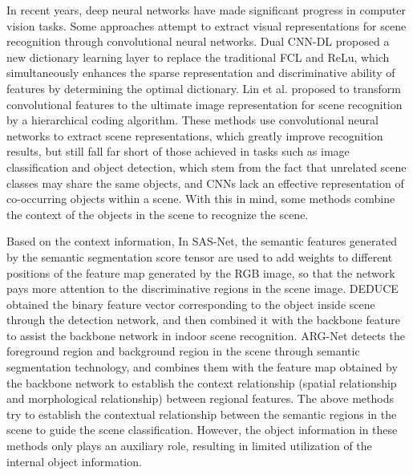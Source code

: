 \documentclass[conference]{IEEEtran}
\begin{document}
In recent years, deep neural networks have made significant progress in computer vision tasks\cite{ref9,ref10,ref11}. Some approaches\cite{ref5,ref12,ref13,ref14} attempt to extract visual representations for scene recognition through convolutional neural networks. Dual CNN-DL\cite{ref13} proposed a new dictionary learning layer to replace the traditional FCL and ReLu, which simultaneously enhances the sparse representation and discriminative ability of features by determining the optimal dictionary. Lin et al.\cite{ref15} proposed to transform convolutional features to the ultimate image representation for scene recognition by a hierarchical coding algorithm. These methods use convolutional neural networks to extract scene representations, which greatly improve recognition results, but still fall far short of those achieved in tasks such as image classification and object detection, which stem from the fact that unrelated scene classes may share the same objects\cite{ref16}, and CNNs lack an effective representation of co-occurring objects within a scene. With this in mind, some methods combine the context of the objects in the scene to recognize the scene. 

Based on the context information, In SAS-Net\cite{ref17}, the semantic features generated by the semantic segmentation score tensor are used to add weights to different positions of the feature map generated by the RGB image, so that the network pays more attention to the discriminative regions in the scene image. DEDUCE\cite{ref18} obtained the binary feature vector corresponding to the object inside scene through the detection network, and then combined it with the backbone feature to assist the backbone network in indoor scene recognition. ARG-Net\cite{ref19} detects the foreground region and background region in the scene through semantic segmentation technology, and combines them with the feature map obtained by the backbone network to establish the context relationship (spatial relationship and morphological relationship) between regional features. The above methods try to establish the contextual relationship between the semantic regions in the scene to guide the scene classification. However, the object information in these methods only plays an auxiliary role, resulting in limited utilization of the internal object information.
\end{document}
